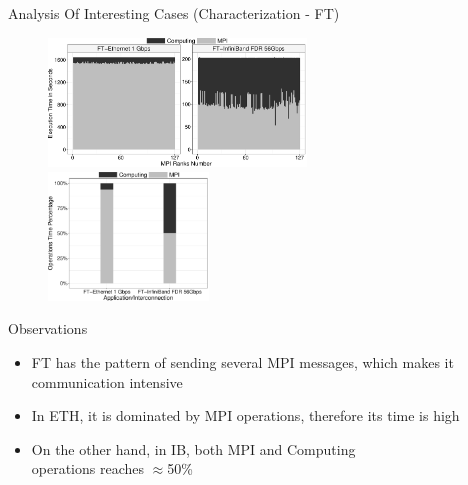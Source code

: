 \documentclass{beamer}
\begin{document}
\begin{frame}{Analysis Of Interesting Cases (Characterization - FT)}
\begin{figure}
   \includegraphics[width=0.61\textwidth]{SLIDES/img/FT.charac.pdf}
   \includegraphics[width=0.38\textwidth]{SLIDES/img/FT.percentage.pdf}
\end{figure}
\pause Observations
\begin{itemize}
    \item FT has the pattern of sending several MPI messages, which makes it \alert{communication intensive}
    \pause \item In ETH, it is \alert{dominated by MPI operations}, therefore its time is high
    \pause \item On the other hand, in IB, both MPI and Computing \\operations reaches \alert{$\approx$50\%}
\end{itemize}
\end{frame}
\end{document}
